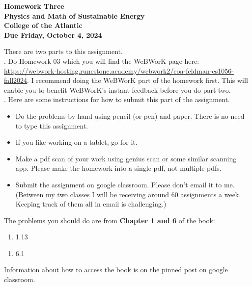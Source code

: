 \documentclass[12pt]{article}
\begin{document}
\pagestyle{empty}
 
\begin{center}
{\LARGE {\bf Homework Three}}\\
\bigskip
{\Large {\bf Physics and Math of Sustainable Energy}}\\
\bigskip
{\Large {\bf College of the Atlantic}}\\
\bigskip
{ {\bf Due Friday, October 4, 2024}}\\ 
\end{center}
\medskip


\noindent There are two parts to this assignment.\\

.  Do Homework 03 which you
will find the WeBWorK page here:
\url{https://webwork-hosting.runestone.academy/webwork2/coa-feldman-es1056-fall2024}.
I recommend doing the WeBWorK part of the homework first. This will
enable you to benefit WeBWorK's instant feedback before you do part
two.\\ 


.  Here are some
instructions for how to submit this part of the assignment.
\begin{itemize}
\item Do the problems by hand using pencil (or pen) and paper.
  There is no need to type this assignment.
\item If you like working on a tablet, go for it. 
\item Make a pdf scan of your work using genius scan or some
  similar scanning app.  Please make the homework into a single
  pdf, not multiple pdfs.
\item Submit the assignment on google classroom.  Please don't
  email it to me.  (Between my two classes I will be receiving
  around 60 assignments a week.  Keeping track of them all in email 
  is challenging.)\\
\end{itemize}

\noindent The problems you should do are from {\bf Chapter 1 and 6} of the
book: \\ 


\begin{enumerate}
\setlength{\itemsep}{-1mm}
\item 1.13
\end{enumerate}

  \begin{enumerate}
    \setlength{\itemsep}{-1mm}
  \item 6.1
  \end{enumerate}
  
\noindent Information about how to access the book is on the
pinned post on google classroom. 
\end{document}
